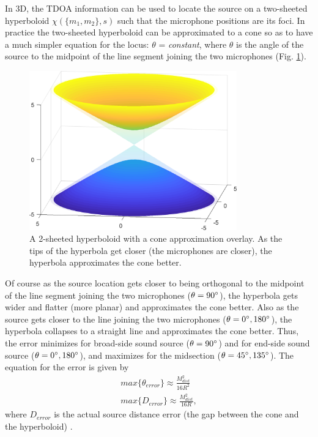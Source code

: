 In 3D, the TDOA information can be used to locate the source on a two-sheeted hyperboloid $\chi(\{m_{1},m_{2}\},s)$ such that the microphone positions are its foci. In practice the two-sheeted hyperboloid can be approximated to a cone so as to have a much simpler equation for the locus: $\theta$  = \textit{constant}, where $\theta$ is the angle of the source to the  midpoint of the line segment joining the two microphones (Fig. \ref{fig:hyperboloid_Cone}).

\begin{figure}[H]
    \centering
    \includegraphics[width=0.8\textwidth]{Figures/hyperboloid.png}
    \caption{A 2-sheeted hyperboloid with a cone approximation overlay. As the tips of the hyperbola get closer (the microphones are closer), the hyperbola approximates the cone better.}
    \label{fig:hyperboloid_Cone}
\end{figure}

Of course as the source location gets closer to being orthogonal to the midpoint of the line segment joining the two microphones ($\theta=90\degree$), the hyperbola gets wider and flatter (more planar) and approximates the cone better. Also as the source gets closer to the line joining the two microphones ($\theta=0\degree, 180\degree$), the hyperbola collapses to a straight line and approximates the cone better. Thus, the error minimizes for broad-side sound source ($\theta=90\degree$) and for end-side sound source ($\theta=0\degree, 180\degree$), and maximizes for the midsection ($\theta=45\degree, 135\degree$). The equation for the error is given by
\begin{equation}
\begin{split}
    max\{\theta_{error}\} \approx  \frac{M_{dist}^2}{16R^2}\\
    max\{D_{error}\} \approx  \frac{M_{dist}^2}{16R},
\end{split}
\end{equation}
where $D_{error}$ is the actual source distance error (the gap between the cone and the hyperboloid) \cite{Brandstein:1995:FSS:922154}.

